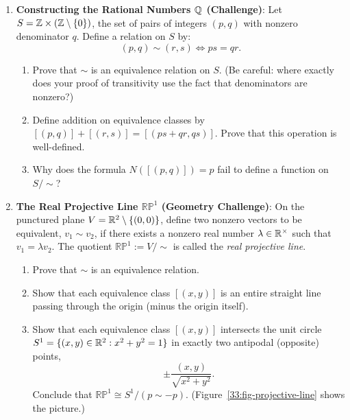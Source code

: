 \begin{enumerate}
  \item \textbf{Constructing the Rational Numbers $\mathbb{Q}$ (Challenge)}:
  Let $S = \mathbb{Z} \times (\mathbb{Z} \setminus \{0\})$, the set of pairs of integers $(p, q)$ with nonzero denominator $q$. Define a relation on $S$ by:
  \[
  (p, q) \sim (r, s) \iff ps = qr.
  \]
  \begin{enumerate}
    \item Prove that $\sim$ is an equivalence relation on $S$. (Be careful: where exactly does your proof of transitivity use the fact that denominators are nonzero?)
    \item Define addition on equivalence classes by $[(p, q)] + [(r, s)] = [(ps + qr, qs)]$. Prove that this operation is well-defined.
    \item Why does the formula $N([(p, q)]) = p$ fail to define a function on $S/\!\sim$?
  \end{enumerate}

  \item \textbf{The Real Projective Line $\mathbb{RP}^1$ (Geometry Challenge)}:
  On the punctured plane $V = \mathbb{R}^2 \setminus \{(0, 0)\}$, define two nonzero vectors to be equivalent, $v_1 \sim v_2$, if there exists a nonzero real number $\lambda \in \mathbb{R}^\times$ such that $v_1 = \lambda v_2$. The quotient $\mathbb{RP}^1 := V/\!\sim$ is called the \emph{real projective line}.
  \begin{enumerate}
    \item Prove that $\sim$ is an equivalence relation.
    \item Show that each equivalence class $[(x, y)]$ is an entire straight line passing through the origin (minus the origin itself).
    \item Show that each equivalence class $[(x, y)]$ intersects the unit circle $S^1 = \{(x, y) \in \mathbb{R}^2 : x^2 + y^2 = 1\}$ in exactly two antipodal (opposite) points,
    \[
    \pm \frac{(x, y)}{\sqrt{x^2 + y^2}}.
    \]
    Conclude that $\mathbb{RP}^1 \cong S^1/(p \sim -p)$. (Figure~\ref{33:fig-projective-line} shows the picture.)
  \end{enumerate}


\end{enumerate}
